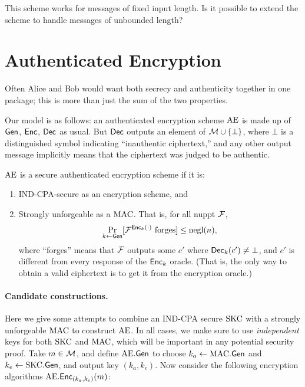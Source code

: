 \documentclass[11pt]{article}
\begin{document}
\begin{exercise} 
  This scheme works for messages of fixed input length.  Is it
  possible to extend the scheme to handle messages of unbounded
  length?
\end{exercise}

\section{Authenticated Encryption}
\label{sec:auth-encrypt}

Often Alice and Bob would want both secrecy and authenticity together
in one package; this is more than just the sum of the two properties.

Our model is as follows: an authenticated encryption scheme
$\text{AE}$ is made up of $\mathsf{Gen}$, $\mathsf{Enc}$, $\mathsf{Dec}$ as usual.
But $\mathsf{Dec}$ outputs an element of $\mathcal{M} \cup \{\bot\}$, where
$\bot$ is a distinguished symbol indicating ``inauthentic
ciphertext,'' and any other output message implicitly means that the
ciphertext was judged to be authentic.

\begin{definition}
  $\text{AE}$ is a secure authenticated encryption scheme if it is:
  \begin{enumerate}
  \item IND-CPA-secure as an encryption scheme, and
  \item Strongly unforgeable as a $\text{MAC}$.  That is, for all nuppt
    $\mathcal{F}$,
    \[
    \Pr_{k \gets \mathsf{Gen}}[\mathcal{F}^{\mathsf{Enc}_k(\cdot)} \text{ forges}] \leq \operatorname{negl}(n),
    \]
    where ``forges'' means that $\mathcal{F}$ outputs some $c'$ where
    $\mathsf{Dec}_k(c') \neq \bot$, and $c'$ is different from every
    response of the $\mathsf{Enc}_{k}$ oracle.  (That is, the only way to
    obtain a valid ciphertext is to get it from the encryption
    oracle.)
  \end{enumerate}
\end{definition}

\paragraph{Candidate constructions.}

Here we give some attempts to combine an IND-CPA secure $\text{SKC}$ with a
strongly unforgeable $\text{MAC}$ to construct $\text{AE}$.  In all cases,
we make sure to use \emph{independent} keys for both $\text{SKC}$ and
$\text{MAC}$, which will be important in any potential security proof.  Take
$m \in \mathcal{M}$, and define $\text{AE}.\mathsf{Gen}$ to choose $k_a
\gets \text{MAC}.\mathsf{Gen}$ and $k_e \gets \text{SKC}.\mathsf{Gen}$, and output
key $(k_{a}, k_{e})$.  Now consider the following encryption
algorithms $\text{AE}.\mathsf{Enc}_{(k_{a},k_{e})}(m)$:
\end{document}
